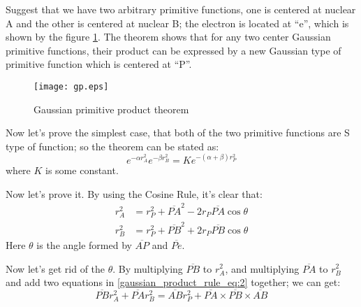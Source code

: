 Suggest that we have two arbitrary primitive functions, one is centered at nuclear A and the other
is centered at nuclear B; the electron is located at ``e'', which is shown by the figure \ref{fg:1}.
The theorem shows that for any two center Gaussian primitive functions, their product can be 
expressed by a new Gaussian type of primitive function which is centered at ``P''.

\begin{figure}[!hbp]
\begin{center}
\texttt{[image: gp.eps]}
\caption{Gaussian primitive product theorem}
\label{fg:1}
\end{center}
\end{figure}

Now let's prove the simplest case, that both of the two primitive functions are S type of function; 
so the theorem can be stated as:
\begin{equation}
 \label{gaussian_product_rule_eq:1}
e^{-\alpha r_{A}^{2}}e^{-\beta r_{B}^{2}} = Ke^{-(\alpha+\beta) r_{P}^{2}}
\end{equation}
where $K$ is some constant.

Now let's prove it. By using the Cosine Rule, it's clear that:
\begin{align}
 \label{gaussian_product_rule_eq:2}
r_{A}^{2} &= r_{P}^{2} + \overline{PA}^{2} -2r_{P}\overline{PA}\cos\theta \nonumber \\
r_{B}^{2} &= r_{P}^{2} + \overline{PB}^{2} +2r_{P}\overline{PB}\cos\theta
\end{align}
Here $\theta$ is the angle formed by $\overline{AP}$ and $\overline{Pe}$.

Now let's get rid of the $\theta$. By multiplying $\overline{PB}$ to $r_{A}^{2}$, and 
multiplying $\overline{PA}$ to $r_{B}^{2}$ and add two equations in \ref{gaussian_product_rule_eq:2}
together; we can get:
\begin{equation}
 \label{gaussian_product_rule_eq:3}
\overline{PB}r_{A}^{2} + \overline{PA}r_{B}^{2} = \overline{AB}r_{P}^{2} + 
\overline{PA}\times\overline{PB}\times\overline{AB}
\end{equation}

